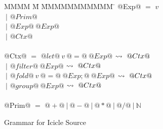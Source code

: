 
\begin{figure}

\begin{tabbing}
MMMM \= M \= MMMMMMMMMMM \= \kill
@Exp@
    \> $=$  \> $v$ \\
    \> $~|$ \> $@Prim@$ \\
    \> $~|$ \> $@Exp@~@Exp@$ \\
    \> $~|$ \> $@Ctx@$ \\
\\
@Ctx@
    \> $=$  \> $@let@~v~@=@~@Exp@$
            \> $\leadsto~@Ctx@$ \\
    \> $~|$ \> $@filter@~@Exp@$
            \> $\leadsto~@Ctx@$ \\
    \> $~|$ \> $@fold@~v~@=@~@Exp;@~@Exp@$
            \> $\leadsto~@Ctx@$ \\

    \> $~|$ \> $@group@~@Exp@$
            \> $\leadsto~@Ctx@$ \\
\\
@Prim@
    \> $=$  \> $@+@~|~@-@~|~@*@~|~@/@~|~\mathbb{N}$ \\
\end{tabbing}


\caption{Grammar for Icicle Source}
\label{fig:source:grammar}
\end{figure}

